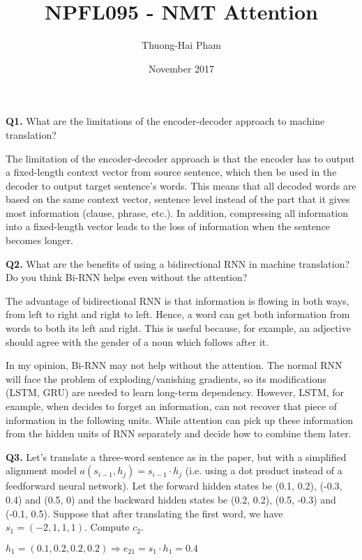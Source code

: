 \documentclass{article}
\title{NPFL095 - NMT Attention}
\author{Thuong-Hai Pham}
\date{November 2017}
\begin{document}
\maketitle

\textbf{Q1.} What are the limitations of the encoder-decoder approach to machine translation?

The limitation of the encoder-decoder approach is that the encoder has to output a fixed-length context vector from source sentence, which then be used in the decoder to output target sentence's words. This means that all decoded words are based on the same context vector, sentence level instead of the part that it gives most information (clause, phrase, etc.). In addition, compressing all information into a fixed-length vector leads to the loss of information when the sentence becomes longer.

\bigskip

\textbf{Q2.} What are the benefits of using a bidirectional RNN in machine translation? Do you think Bi-RNN helps even without the attention?

The advantage of bidirectional RNN is that information is flowing in both ways, from left to right and right to left. Hence, a word can get both information from words to both its left and right. This is useful because, for example, an adjective should agree with the gender of a noun which follows after it.

In my opinion, Bi-RNN may not help without the attention. The normal RNN will face the problem of exploding/vanishing gradients, so its modifications (LSTM, GRU) are needed to learn long-term dependency. However, LSTM, for example, when decides to forget an information, can not recover that piece of information in the following units. While attention can pick up these information from the hidden units of RNN separately and decide how to combine them later.

\bigskip

\textbf{Q3.} Let's translate a three-word sentence as in the paper, but with a simplified alignment model $a(s_{i-1}, h_j) = s_{i-1} \cdot h_j$ (i.e. using a dot product instead of a feedforward neural network).
Let the forward hidden states be (0.1, 0.2), (-0.3, 0.4) and (0.5, 0)
and the backward hidden states be (0.2, 0.2), (0.5, -0.3) and (-0.1, 0.5).
Suppose that after translating the first word, we have $s_1 = (-2, 1, 1, 1)$.
Compute $c_2$.

$h_1=(0.1,0.2,0.2,0.2) \Rightarrow e_{21}=s_1\cdot h_1=0.4$
\end{document}
